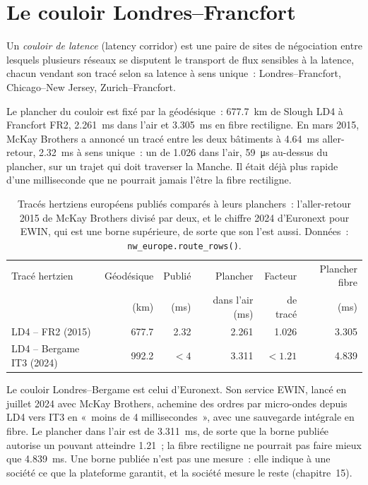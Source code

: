 \section{Le couloir Londres--Francfort}

\begin{definition}\label{def:nw:the-european-map:corridor}
Un \emph{couloir de latence} (latency corridor) est une paire de sites de négociation entre lesquels plusieurs réseaux se disputent le transport de flux sensibles à la latence,
chacun vendant son tracé selon sa latence à sens unique~: Londres--Francfort, Chicago--New Jersey, Zurich--Francfort.
\end{definition}

Le plancher du couloir est fixé par la géodésique~: \qty{677.7}{\kilo\metre} de Slough LD4 à Francfort FR2, \qty{2.261}{\milli\second} dans l'air et
\qty{3.305}{\milli\second} en fibre rectiligne. En mars 2015, McKay Brothers a annoncé un tracé entre les deux bâtiments à
\qty{4.64}{\milli\second} aller-retour, \qty{2.32}{\milli\second} à sens unique~: un  de 1.026 dans l'air, \qty{59}{\micro\second} au-dessus du
plancher, sur un trajet qui doit traverser la Manche. Il était déjà plus rapide d'une milliseconde que ne pourrait jamais l'être la fibre rectiligne.

\begin{table}[ht]
\centering\small
\begin{tabular}{lrrrrr}
\toprule
Tracé hertzien & Géodésique & Publié & Plancher & Facteur & Plancher fibre \\
 & (km) & (ms) & dans l'air (ms) & de tracé & (ms) \\
\midrule
LD4 -- FR2 (2015) & 677.7 & 2.32 & 2.261 & 1.026 & 3.305 \\
LD4 -- Bergame IT3 (2024) & 992.2 & $< 4$ & 3.311 & $< 1.21$ & 4.839 \\
\bottomrule
\end{tabular}
\caption{Tracés hertziens européens publiés comparés à leurs planchers~: l'aller-retour 2015 de McKay Brothers divisé par deux, et le chiffre 2024 d'Euronext pour
EWIN, qui est une borne supérieure, de sorte que son  l'est aussi. Données~: \texttt{nw\_europe.route\_rows()}.}\label{tab:nw:the-european-map:routes}
\end{table}

Le couloir Londres--Bergame est celui d'Euronext. Son service EWIN, lancé en juillet 2024 avec McKay Brothers, achemine des ordres par micro-ondes depuis
LD4 vers IT3 en «~moins de 4 millisecondes~», avec une sauvegarde intégrale en fibre. Le plancher dans l'air est de \qty{3.311}{\milli\second}, de sorte que la borne publiée
autorise un  pouvant atteindre 1.21~; la fibre rectiligne ne pourrait pas faire mieux que \qty{4.839}{\milli\second}. Une borne publiée n'est pas une
mesure~: elle indique à une société ce que la plateforme garantit, et la société mesure le reste (chapitre~15).

